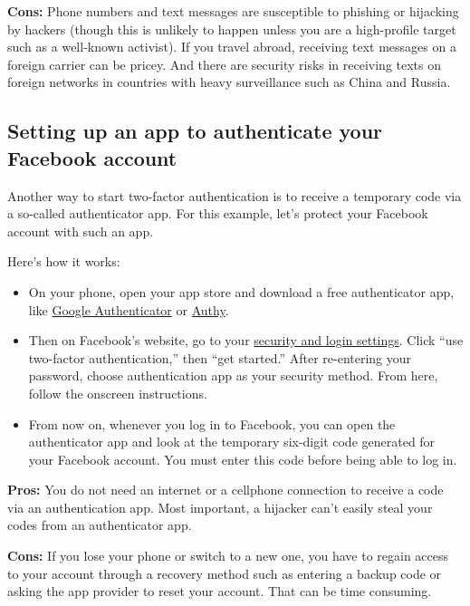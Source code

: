 \textbf{Cons:} Phone numbers and text messages are susceptible to
phishing or hijacking by hackers (though this is unlikely to happen
unless you are a high-profile target such as a well-known activist). If
you travel abroad, receiving text messages on a foreign carrier can be
pricey. And there are security risks in receiving texts on foreign
networks in countries with heavy surveillance such as China and Russia.

\hypertarget{setting-up-an-app-to-authenticate-your-facebook-account}{%
\subsection{Setting up an app to authenticate your Facebook
account}\label{setting-up-an-app-to-authenticate-your-facebook-account}}

Another way to start two-factor authentication is to receive a temporary
code via a so-called authenticator app. For this example, let's protect
your Facebook account with such an app.

Here's how it works:

\begin{itemize}
\item
  On your phone, open your app store and download a free authenticator
  app, like
  \href{https://itunes.apple.com/us/app/google-authenticator/id388497605?mt=8}{Google
  Authenticator} or
  \href{https://itunes.apple.com/us/app/authy/id494168017?mt=8}{Authy}.
\item
  Then on Facebook's website, go to your
  \href{https://www.facebook.com/settings?tab=security}{security and
  login settings}. Click ``use two-factor authentication,'' then ``get
  started.'' After re-entering your password, choose authentication app
  as your security method. From here, follow the onscreen instructions.
\item
  From now on, whenever you log in to Facebook, you can open the
  authenticator app and look at the temporary six-digit code generated
  for your Facebook account. You must enter this code before being able
  to log in.
\end{itemize}

\textbf{Pros:} You do not need an internet or a cellphone connection to
receive a code via an authentication app. Most important, a hijacker
can't easily steal your codes from an authenticator app.

\textbf{Cons:} If you lose your phone or switch to a new one, you have
to regain access to your account through a recovery method such as
entering a backup code or asking the app provider to reset your account.
That can be time consuming.

